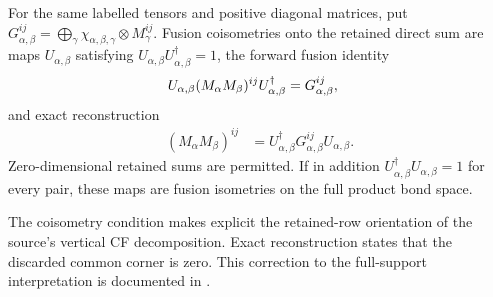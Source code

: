 \begin{definition}
    \label{def:mpdo_bnt_fusion_coisometry_family}
    \leanok
    For the same labelled tensors and positive diagonal matrices, put
    $G_{\alpha,\beta}^{ij}
        =\bigoplus_\gamma\chi_{\alpha,\beta,\gamma}\otimes M_\gamma^{ij}$.
    Fusion coisometries onto the retained direct sum are maps
    $U_{\alpha,\beta}$ satisfying
    $U_{\alpha,\beta}U_{\alpha,\beta}^\dagger=1$, the forward fusion identity
    \begin{align}
        U_{\alpha,\beta}(M_\alpha M_\beta)^{ij}
        U_{\alpha,\beta}^\dagger
         & =G_{\alpha,\beta}^{ij},
        \notag
    \end{align}
    and exact reconstruction
    \begin{align}
        (M_\alpha M_\beta)^{ij}
         & =U_{\alpha,\beta}^\dagger
        G_{\alpha,\beta}^{ij}U_{\alpha,\beta}.
        \label{eq:rfp_coisometry_reconstruction}
    \end{align}
    Zero-dimensional retained sums are permitted. If in addition
    $U_{\alpha,\beta}^\dagger U_{\alpha,\beta}=1$ for every pair, these maps
    are fusion isometries on the full product bond space.

    The coisometry condition makes explicit the retained-row orientation
    of the source's vertical CF decomposition. Exact reconstruction states
    that the discarded common corner is zero. This correction to the
    full-support interpretation is documented in
    \cite{gap:cpsv16_figure11_fusion_coisometry}.
\end{definition}

